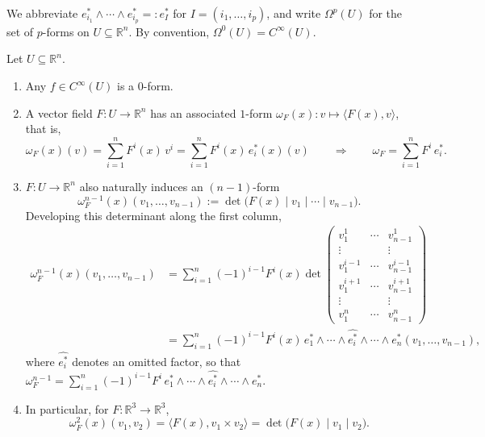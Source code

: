 \begin{notation}
We abbreviate $e_{i_1}^*\wedge\cdots\wedge e_{i_p}^* =: e_I^*$ for $I = (i_1,\ldots,i_p)$, and
write $\Omega^p(U)$ for the set of $p$-forms on $U \subseteq \mathbb{R}^n$. By convention,
$\Omega^0(U) = C^\infty(U)$.
\end{notation}

\begin{example}
Let $U \subseteq \mathbb{R}^n$.
\begin{enumerate}[label=\textbf{\arabic*.}]
  \item Any $f \in C^\infty(U)$ is a $0$-form.
  \item A vector field $F : U \to \mathbb{R}^n$ has an associated $1$-form $\omega_F(x) : v
  \mapsto \langle F(x),v\rangle$, that is,
  \[\omega_F(x)(v) = \sum_{i=1}^n F^i(x)\,v^i = \sum_{i=1}^n F^i(x)\,e_i^*(x)(v)
    \qquad\Longrightarrow\qquad \omega_F = \sum_{i=1}^n F^i\,e_i^*.\]
  \item $F : U \to \mathbb{R}^n$ also naturally induces an $(n-1)$-form
  \[\omega_F^{n-1}(x)(v_1,\ldots,v_{n-1}) := \det\big(F(x)\mid v_1\mid\cdots\mid v_{n-1}\big).\]
  Developing this determinant along the first column,
  \begin{align}
  \omega_F^{n-1}(x)(v_1,\ldots,v_{n-1}) &= \sum_{i=1}^n (-1)^{i-1}F^i(x)\det\!\left(
    \begin{smallmatrix} v_1^1 & \cdots & v_{n-1}^1 \\ \vdots & & \vdots \\ v_1^{i-1} & \cdots &
    v_{n-1}^{i-1} \\ v_1^{i+1} & \cdots & v_{n-1}^{i+1} \\ \vdots & & \vdots \\ v_1^n &
    \cdots & v_{n-1}^n \end{smallmatrix}\right) \nonumber \\
    &= \sum_{i=1}^n (-1)^{i-1}F^i(x)\,e_1^*\wedge\cdots\wedge\widehat{e_i^*}\wedge\cdots\wedge
    e_n^*(v_1,\ldots,v_{n-1}), \nonumber
  \end{align}
  where $\widehat{e_i^*}$ denotes an omitted factor, so that $\omega_F^{n-1} =
  \sum_{i=1}^n (-1)^{i-1}F^i\,e_1^*\wedge\cdots\wedge\widehat{e_i^*}\wedge\cdots\wedge e_n^*$.
  \item In particular, for $F : \mathbb{R}^3 \to \mathbb{R}^3$,
  \[\omega_F^2(x)(v_1,v_2) = \langle F(x),v_1\times v_2\rangle = \det\big(F(x)\mid v_1\mid
    v_2\big).\]
\end{enumerate}
\end{example}

